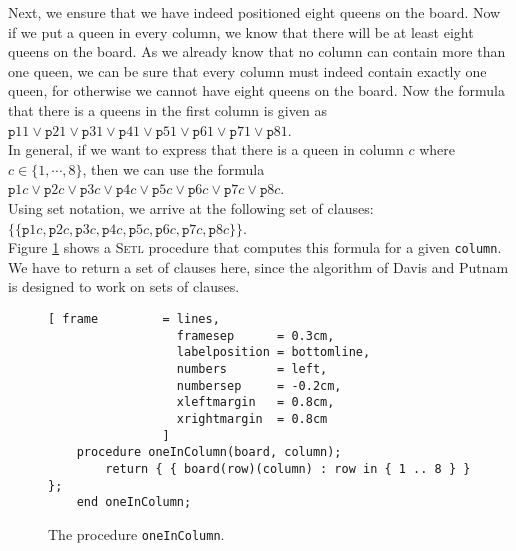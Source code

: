 Next, we ensure that we have indeed positioned eight queens on the board.
Now if we put a queen in every column, we know that there will be at least eight queens on
the board.  As we already know that no column can contain more than one queen, we can be
sure that every column must indeed contain exactly one queen, for otherwise we cannot have
eight queens on the board.  Now the formula that there is a queens in the first column
is given as
\\[0.2cm]
\hspace*{1.3cm}
$\mathtt{p}11 \vee \mathtt{p}21 \vee \mathtt{p}31 \vee \mathtt{p}41 \vee \mathtt{p}51 \vee
\mathtt{p}61 \vee \mathtt{p}71 \vee \mathtt{p}81$.
\\[0.2cm]
In general, if we want to express that there is a queen in column  $c$ where 
 $c \in \{1,\cdots,8\}$, then we can use the formula
\\[0.2cm]
\hspace*{1.3cm}
$\mathtt{p}1c \vee \mathtt{p}2c \vee \mathtt{p}3c \vee \mathtt{p}4c \vee \mathtt{p}5c \vee
\mathtt{p}6c \vee \mathtt{p}7c \vee \mathtt{p}8c$.
\\[0.2cm]
Using set notation, we arrive at the following set of clauses:
\\[0.2cm]
\hspace*{1.3cm}
$\bigl\{ \{\mathtt{p}1c , \mathtt{p}2c , \mathtt{p}3c , \mathtt{p}4c , \mathtt{p}5c ,
\mathtt{p}6c , \mathtt{p}7c , \mathtt{p}8c \}\bigr\}$.
\\[0.2cm]
Figure \ref{fig:oneInColumn} shows a  \textsc{Setl} procedure that computes this formula
for a given \texttt{column}.  We have to return a set of clauses here, since the algorithm
of Davis and Putnam is designed to work on sets of clauses.

\begin{figure}[!ht]
  \centering
\begin{Verbatim}[ frame         = lines, 
                  framesep      = 0.3cm, 
                  labelposition = bottomline,
                  numbers       = left,
                  numbersep     = -0.2cm,
                  xleftmargin   = 0.8cm,
                  xrightmargin  = 0.8cm
                ]
    procedure oneInColumn(board, column);
        return { { board(row)(column) : row in { 1 .. 8 } } };
    end oneInColumn;
\end{Verbatim}
\vspace*{-0.3cm}
  \caption{The procedure \texttt{oneInColumn}.}
  \label{fig:oneInColumn}
\end{figure}

